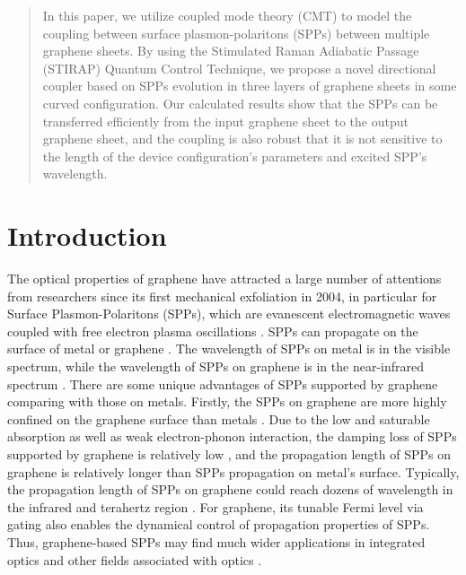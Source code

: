 \documentclass[preprint,12pt,numbers,sort&compress]{elsarticle}
\begin{document}
\begin{frontmatter}
\begin{abstract}
In this paper, we utilize coupled mode theory (CMT) to model the coupling between surface plasmon-polaritons (SPPs) between multiple graphene sheets.
By using the Stimulated Raman Adiabatic Passage (STIRAP) Quantum Control Technique, we propose a novel directional coupler based on SPPs evolution in three layers of graphene sheets in some curved configuration.
Our calculated results show that the SPPs can be transferred efficiently from the input graphene sheet to the output graphene sheet, and the coupling is also robust that it is not sensitive to the length of the device configuration's parameters and excited SPP’s wavelength.
\end{abstract}



\end{frontmatter}



\section{Introduction}
The optical properties of graphene have attracted a large number of attentions from researchers since its first mechanical exfoliation in 2004, in particular for Surface Plasmon-Polaritons (SPPs), which are evanescent electromagnetic waves coupled with free electron plasma oscillations \cite{Gong15}. SPPs can propagate on the surface of metal or graphene \cite{Sanderson15, Luo13, Li17}.
The wavelength of SPPs on metal is in the visible spectrum, while the wavelength of SPPs on graphene is in the near-infrared spectrum \cite{Li14}.
There are some unique advantages of SPPs supported by graphene comparing with those on metals.
Firstly, the SPPs on graphene are more highly confined on the graphene surface than metals \cite{Barnes04, Williams08, Zayats05, Ditlbacher02, Ooi16}.
Due to the low and saturable absorption as well as weak electron-phonon interaction, the damping loss of SPPs supported by graphene is relatively low \cite{Tassin12, Koppens11}, and the propagation length of SPPs on graphene is relatively longer than SPPs propagation on metal's surface.
Typically, the propagation length of SPPs on graphene could reach dozens of wavelength in the infrared and terahertz region \cite{Wang12,Jablan09, Luo13}.
For graphene, its tunable Fermi level via gating also enables the dynamical control of propagation properties of SPPs.
Thus, graphene-based SPPs may find much wider applications in integrated optics and other fields associated with optics \cite{Bludov12,Salihoglu12}.
\end{document}
